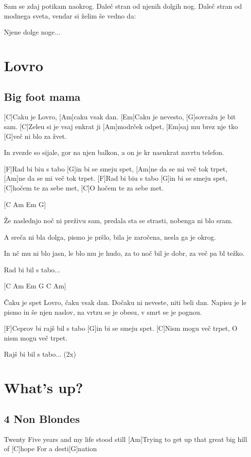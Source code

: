 \documentclass[a4paper,12pt]{article}
\begin{document}
\begin{multicols}{2}
\begin{guitar}
Sam se zdaj potikam naokrog.
Daleč stran od njenih dolgih nog.
Daleč stran od modnega sveta,
vendar si želim še vedno da:


Njene dolge noge...   

\end{guitar}
\section{Lovro}
\subsection*{Big foot mama}
\begin{guitar}
[C Am Em G] 

[C]Caku je Lovro, [Am]caku vsak dan.
[Em]Caku je nevesto, [G]sovražu je bit sam.
[C]Zeleu si je vsaj enkrat ji [Am]modrček odpet,
[Em]saj mu brez nje tko [G]več ni blo za žvet.


In zvezde so sijale, gor na njen balkon,
a on je kr naenkrat zavrtu telefon.


[F]Rad bi biu s tabo [G]in bi se smeju spet,
[Am]ne da se mi več tok trpet,
[Am]ne da se mi več tok trpet.
[F]Rad bi biu s tabo [G]in bi se smeju spet,
[C]hočem te za sebe met,
[C]O hočem te za sebe met.

[C Am Em G] 

Že naslednjo noč ni preživu sam, 
predala sta se strasti,
nobenga ni blo sram.


A sreča ni bla dolga, pismo je pršlo,
bila je zaročena, nesla ga je okrog.


In nč mu ni blo jasn, 
le blo mu je hudo, 
za to noč bil je dobr, 
za več pa bl težko.


Rad bi bil s tabo...
 
[C Am Em G C Am]

Čaku je spet Lovro, čaku vsak dan.
Dočaku ni neveste, niti beli dan.
Napisu je le pismo in še njen naslov,
na vrtzu se je obesu, v smrt se je pognou. 

                         
[F]Ceprov bi rajš bil s tabo 
[G]in bi se smeju spet.
[C]Nism mogu več trpet,
O nism mogu več trpet.


Rajš bi bil s tabo... (2x)

\end{guitar}
\section{What's up?}
\subsection*{4 Non Blondes}
\begin{guitar}
[G]Twenty Five years and my life stood still
[Am]Trying to get up that 
great big hill of [C]hope
For a desti[G]nation



\end{guitar}
\end{multicols}
\end{document}
